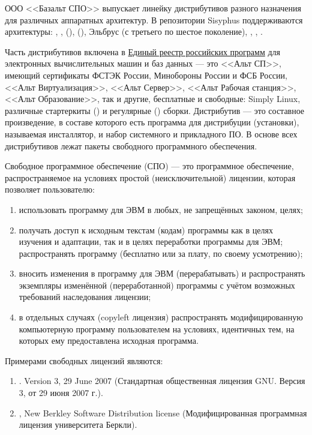 ООО <<Базальт СПО>> выпускает линейку дистрибутивов разного назначения для различных аппаратных архитектур.
В репозитории Sisyphus поддерживаются архитектуры: , ,  (),  (), 
Эльбрус (с третьего по шестое поколение), , , .

Часть дистрибутивов включена в \href{https://reestr.digital.gov.ru}{Единый реестр российских программ} для электронных 
вычислительных машин и баз данных --- это <<Альт СП>>, имеющий сертификаты ФСТЭК России, 
Минобороны России и ФСБ России, <<Альт Виртуализация>>, <<Альт Сервер>>, <<Альт Рабочая станция>>, 
<<Альт Образование>>, так и другие, бесплатные и свободные: Simply Linux, различные стартеркиты 
() и регулярные () сборки. Дистрибутив --- это составное произведение, 
в составе которого есть программа для дистрибуции (установки), называемая инсталлятор, и 
набор системного и прикладного ПО. В основе всех дистрибутивов лежат пакеты свободного 
программного обеспечения.

Свободное программное обеспечение (СПО) --- это программное обеспечение, распространяемое 
на условиях простой (неисключительной) лицензии, которая позволяет пользователю:
\begin{enumerate}
	\item использовать программу для ЭВМ в любых, не запрещённых законом, целях;
	\item получать доступ к исходным текстам (кодам) программы как в целях изучения и адаптации, 
	так и в целях переработки программы для ЭВМ; распространять программу (бесплатно или за плату, по своему усмотрению);
	\item вносить изменения в программу для ЭВМ (перерабатывать) и распространять экземпляры изменённой (переработанной) 
	программы с учётом возможных требований наследования лицензии;
	\item в отдельных случаях (copyleft лицензия) распространять модифицированную компьютерную программу пользователем 
	на условиях, идентичных тем, на которых ему предоставлена исходная программа.
\end{enumerate}

Примерами свободных лицензий являются:
\begin{enumerate}
	\item \href{https://www.gnu.org/licenses/gpl-3.0.html}{}. Version 3, 29 June 2007 (Стандартная общественная лицензия GNU. Версия 3, от 29 июня 2007 г.).
	\item \href{https://en.wikipedia.org/wiki/BSD_licenses}{}, New Berkley Software Distribution license (Модифицированная программная лицензия университета Беркли).
\end{enumerate}

